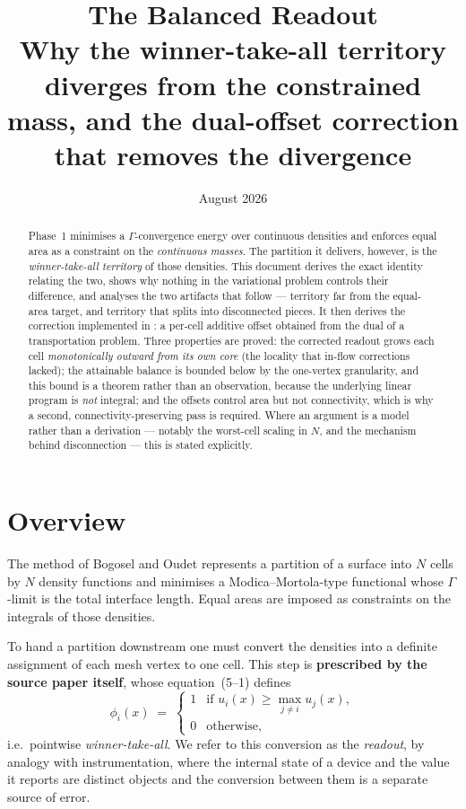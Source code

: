 \documentclass[11pt,a4paper]{article}
\title{\textbf{The Balanced Readout}\\[0.5em]
  \large Why the winner-take-all territory diverges from the constrained mass,
  and the dual-offset correction that removes the divergence}
\author{}
\date{August 2026}
\begin{document}
\maketitle

\begin{abstract}
Phase~1 minimises a $\Gamma$-convergence energy over continuous densities and
enforces equal area as a constraint on the \emph{continuous masses}. The partition
it delivers, however, is the \emph{winner-take-all territory} of those densities.
This document derives the exact identity relating the two, shows why nothing in
the variational problem controls their difference, and analyses the two artifacts
that follow --- territory far from the equal-area target, and territory that
splits into disconnected pieces. It then derives the correction implemented in
: a per-cell additive offset obtained
from the dual of a transportation problem. Three properties are proved: the
corrected readout grows each cell \emph{monotonically outward from its own core}
(the locality that in-flow corrections lacked); the attainable balance is bounded
below by the one-vertex granularity, and this bound is a theorem rather than an
observation, because the underlying linear program is \emph{not} integral; and the
offsets control area but not connectivity, which is why a second, connectivity-preserving
pass is required. Where an argument is a model rather than a derivation ---
notably the worst-cell scaling in $N$, and the mechanism behind disconnection ---
this is stated explicitly.
\end{abstract}

\tableofcontents
\newpage

\section{Overview}

The method of Bogosel and Oudet \cite{bogosel2017partitions} represents a
partition of a surface into $N$ cells by $N$ density functions and minimises a
Modica--Mortola-type functional \cite{modica1977esempio, modica1987gradient} whose
$\Gamma$-limit is the total interface length. Equal areas are imposed as
constraints on the integrals of those densities.

To hand a partition downstream one must convert the densities into a definite
assignment of each mesh vertex to one cell. This step is \textbf{prescribed by the
source paper itself}, whose equation~(5--1) defines
\[
  \phi_i(x) \;=\;
  \begin{cases}
    1 & \text{if } u_i(x) \ge \max_{j \neq i} u_j(x),\\
    0 & \text{otherwise,}
  \end{cases}
\]
i.e.\ pointwise \emph{winner-take-all}. We refer to this conversion as the
\emph{readout}, by analogy with instrumentation, where the internal state of a
device and the value it reports are distinct objects and the conversion between
them is a separate source of error.
\end{document}
